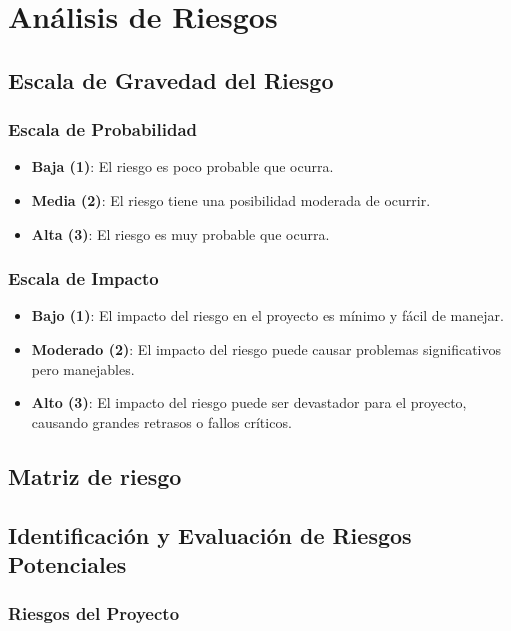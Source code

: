 \section{Análisis de Riesgos}

\subsection{Escala de Gravedad del Riesgo}

\subsubsection{Escala de Probabilidad}

\begin{itemize}
    \item \textbf{Baja (1)}: El riesgo es poco probable que ocurra.
    \item \textbf{Media (2)}: El riesgo tiene una posibilidad moderada de ocurrir.
    \item \textbf{Alta (3)}: El riesgo es muy probable que ocurra.
\end{itemize}

\subsubsection{Escala de Impacto}

\begin{itemize}
    \item \textbf{Bajo (1)}: El impacto del riesgo en el proyecto es mínimo y fácil de manejar.
    \item \textbf{Moderado (2)}: El impacto del riesgo puede causar problemas significativos pero manejables.
    \item \textbf{Alto (3)}: El impacto del riesgo puede ser devastador para el proyecto, causando grandes retrasos o fallos críticos.
\end{itemize}

\subsection*{Matriz de riesgo}

\subsection{Identificación y Evaluación de Riesgos Potenciales}

\subsubsection{Riesgos del Proyecto}

